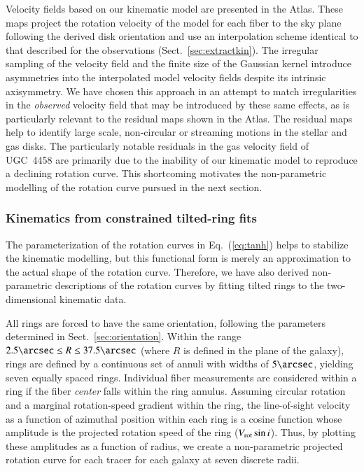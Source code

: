 \documentclass[traditabstract]{aa} %
\begin{document}
Velocity fields based on our kinematic model are presented in the Atlas.  These
maps project the rotation velocity of the model for each fiber to the sky plane
following the derived disk orientation and use an interpolation scheme identical
to that described for the observations (Sect.~\ref{sec:extractkin}).  The
irregular sampling of the velocity field and the finite size of the Gaussian
kernel introduce asymmetries into the interpolated model velocity fields despite
its intrinsic axisymmetry.  We have chosen this approach in an attempt to match
irregularities in the {\it observed} velocity field that may be introduced by
these same effects, as is particularly relevant to the residual maps shown in
the Atlas.  The residual maps help to identify large scale, non-circular or
streaming motions in the stellar and gas disks.  The particularly notable
residuals in the gas velocity field of UGC~4458 are primarily due to the
inability of our kinematic model to reproduce a declining rotation curve.  This
shortcoming motivates the non-parametric modelling of the rotation curve pursued
in the next section.


\subsubsection{Kinematics from constrained tilted-ring fits}
\label{sec:tiltedrings}

The parameterization of the rotation curves in Eq.~(\ref{eq:tanh}) helps to
stabilize the kinematic modelling, but this functional form is merely an
approximation to the actual shape of the rotation curve.  Therefore, we have
also derived non-parametric descriptions of the rotation curves by fitting
tilted rings to the two-dimensional kinematic data.

All rings are forced to have the same orientation, following the parameters
determined in Sect.~\ref{sec:orientation}.  Within the range $2.5\arcsec \leq
R \leq 37.5\arcsec$ (where $R$ is defined in the plane of the galaxy), rings are
defined by a continuous set of annuli with widths of $5\arcsec$, yielding seven
equally spaced rings.  Individual fiber measurements are considered within a
ring if the fiber {\it center} falls within the ring annulus.  Assuming circular
rotation and a marginal rotation-speed gradient within the ring, the
line-of-sight velocity as a function of azimuthal position within each ring is a
cosine function whose amplitude is the projected rotation speed of the ring
($V_{\rm rot} \sin i$).  Thus, by plotting these amplitudes as a function of radius,
we create a non-parametric projected rotation curve for each tracer for each
galaxy at seven discrete radii.
\end{document}
